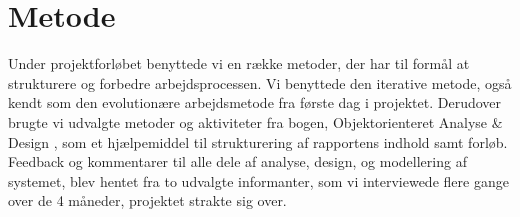 \chapter{Metode}
\label{chap:metode}
Under projektforløbet benyttede vi  en række metoder, der har til formål at strukturere og forbedre arbejdsprocessen. Vi benyttede den iterative metode, også kendt som den evolutionære arbejdsmetode fra første dag i projektet. Derudover brugte vi udvalgte metoder og aktiviteter fra bogen, Objektorienteret Analyse \& Design \cite{ooad}, som et hjælpemiddel til strukturering af rapportens indhold samt forløb. Feedback og kommentarer til alle dele af analyse, design, og modellering af systemet, blev hentet fra to udvalgte informanter, som vi interviewede flere gange over de 4 måneder, projektet strakte sig over.







